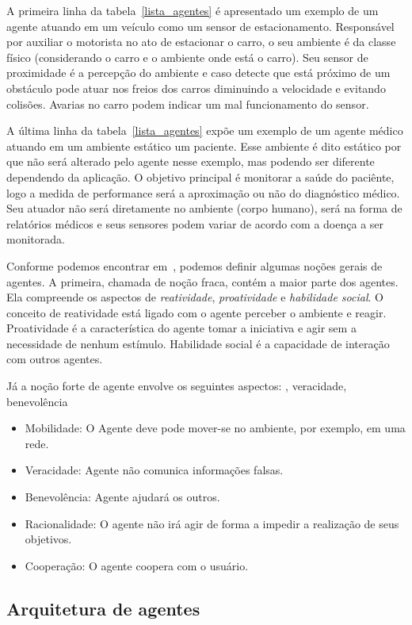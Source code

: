 A primeira linha da tabela~\ref{lista_agentes} é apresentado um exemplo de um agente atuando em um veículo como um sensor de estacionamento. Responsável por auxiliar o motorista no ato de estacionar o carro, o seu ambiente é da classe físico (considerando o carro e o ambiente onde está o carro). Seu sensor de proximidade é a percepção do ambiente e caso detecte que está próximo de um obstáculo pode atuar nos freios dos carros diminuindo a velocidade e evitando colisões. Avarias no carro podem indicar um mal funcionamento do sensor.

A última linha da tabela~\ref{lista_agentes} expõe um exemplo de um agente médico atuando em um ambiente estático um paciente. Esse ambiente é dito estático por que não será alterado pelo agente nesse exemplo, mas podendo ser diferente dependendo da aplicação. O objetivo principal é monitorar a saúde do paciênte, logo a medida de performance será a aproximação ou não do diagnóstico médico. Seu atuador não será diretamente no ambiente (corpo humano), será na forma de relatórios médicos e seus sensores podem variar de acordo com a doença a ser monitorada.

Conforme podemos encontrar em~\cite{wooldridge04}, podemos definir algumas noções gerais de agentes. A primeira, chamada de noção fraca, contém a maior parte dos agentes. Ela compreende os aspectos de \emph{reatividade}, \emph{proatividade} e \emph{habilidade social}. O conceito de reatividade  está ligado com o agente perceber o ambiente e reagir. Proatividade é a característica do agente tomar a iniciativa e agir sem a necessidade de nenhum estímulo. Habilidade social é a capacidade de interação com outros agentes.

Já a noção forte de agente envolve os seguintes aspectos: , veracidade, benevolência
\begin{itemize}
	\item Mobilidade: O Agente deve pode mover-se no ambiente, por exemplo, em uma rede.
	\item Veracidade: Agente não comunica informações falsas.
	\item Benevolência: Agente ajudará os outros.
	\item Racionalidade: O agente não irá agir de forma a impedir a realização de seus objetivos.
	\item Cooperação: O agente coopera com o usuário.
\end{itemize}

\subsection{Arquitetura de agentes}

